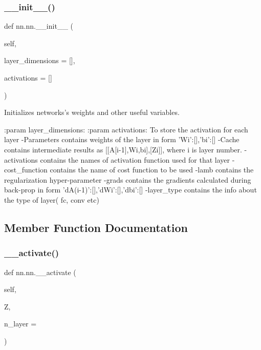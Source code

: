 \subsubsection{\texorpdfstring{\+\_\+\+\_\+init\+\_\+\+\_\+()}{\_\_init\_\_()}}
{\footnotesize\ttfamily def nn.\+nn.\+\_\+\+\_\+init\+\_\+\+\_\+ (\begin{DoxyParamCaption}\item[{}]{self,  }\item[{}]{layer\+\_\+dimensions = {\ttfamily \mbox{[}\mbox{]}},  }\item[{}]{activations = {\ttfamily \mbox{[}\mbox{]}} }\end{DoxyParamCaption})}

\begin{DoxyVerb}Initializes networks's weights and other useful variables.

:param layer_dimensions:
:param activations: To store the activation for each layer
-Parameters contains weights of the layer in form {'Wi':[],'bi':[]}
-Cache contains intermediate results as [[A[i-1],Wi,bi],[Zi]], where i
 is layer number.
-activations contains the names of activation function used for that layer
-cost_function  contains the name of cost function to be used
-lamb contains the regularization hyper-parameter
-grads contains the gradients calculated during back-prop in form {'dA(i-1)':[],'dWi':[],'dbi':[]}
-layer_type contains the info about the type of layer( fc, conv etc)
\end{DoxyVerb}
 

\subsection{Member Function Documentation}
\mbox{\label{classnn_1_1nn_a1cefed6bf4fd61d437e68c901a15fda2}} 
\subsubsection{\texorpdfstring{\+\_\+\+\_\+activate()}{\_\_activate()}}
{\footnotesize\ttfamily def nn.\+nn.\+\_\+\+\_\+activate (\begin{DoxyParamCaption}\item[{}]{self,  }\item[{}]{Z,  }\item[{}]{n\+\_\+layer = {} }\end{DoxyParamCaption})\hspace{0.3cm}{\ttfamily [private]}}

